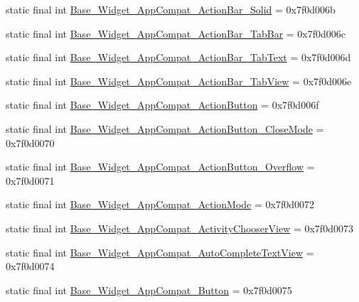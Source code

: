 \begin{DoxyCompactItemize}
\item 
static final int \mbox{\hyperlink{classandroid_1_1support_1_1design_1_1_r_1_1style_a1f9e47e1c00a31c23b8ac75d6b4adb6b}{Base\+\_\+\+Widget\+\_\+\+App\+Compat\+\_\+\+Action\+Bar\+\_\+\+Solid}} = 0x7f0d006b
\item 
static final int \mbox{\hyperlink{classandroid_1_1support_1_1design_1_1_r_1_1style_aa4eca4c56c553fe2c7950b72fefae483}{Base\+\_\+\+Widget\+\_\+\+App\+Compat\+\_\+\+Action\+Bar\+\_\+\+Tab\+Bar}} = 0x7f0d006c
\item 
static final int \mbox{\hyperlink{classandroid_1_1support_1_1design_1_1_r_1_1style_aa8ddc5fdad0f299e2b52eddda088ebe8}{Base\+\_\+\+Widget\+\_\+\+App\+Compat\+\_\+\+Action\+Bar\+\_\+\+Tab\+Text}} = 0x7f0d006d
\item 
static final int \mbox{\hyperlink{classandroid_1_1support_1_1design_1_1_r_1_1style_a2dad992aa3516234c551f7f759ff3b28}{Base\+\_\+\+Widget\+\_\+\+App\+Compat\+\_\+\+Action\+Bar\+\_\+\+Tab\+View}} = 0x7f0d006e
\item 
static final int \mbox{\hyperlink{classandroid_1_1support_1_1design_1_1_r_1_1style_a4c4022741dec751bc0474b30cc3f7ac7}{Base\+\_\+\+Widget\+\_\+\+App\+Compat\+\_\+\+Action\+Button}} = 0x7f0d006f
\item 
static final int \mbox{\hyperlink{classandroid_1_1support_1_1design_1_1_r_1_1style_a0b796011a9c0f9cf164281e2217c9300}{Base\+\_\+\+Widget\+\_\+\+App\+Compat\+\_\+\+Action\+Button\+\_\+\+Close\+Mode}} = 0x7f0d0070
\item 
static final int \mbox{\hyperlink{classandroid_1_1support_1_1design_1_1_r_1_1style_ac6620c5c97b037d4dd21cca350cea322}{Base\+\_\+\+Widget\+\_\+\+App\+Compat\+\_\+\+Action\+Button\+\_\+\+Overflow}} = 0x7f0d0071
\item 
static final int \mbox{\hyperlink{classandroid_1_1support_1_1design_1_1_r_1_1style_afadec33a3b80d10805dd65b0600a194b}{Base\+\_\+\+Widget\+\_\+\+App\+Compat\+\_\+\+Action\+Mode}} = 0x7f0d0072
\item 
static final int \mbox{\hyperlink{classandroid_1_1support_1_1design_1_1_r_1_1style_a1453879def50220f41b8becea7ed382b}{Base\+\_\+\+Widget\+\_\+\+App\+Compat\+\_\+\+Activity\+Chooser\+View}} = 0x7f0d0073
\item 
static final int \mbox{\hyperlink{classandroid_1_1support_1_1design_1_1_r_1_1style_a9858e7079d9ba63620d2767358539c57}{Base\+\_\+\+Widget\+\_\+\+App\+Compat\+\_\+\+Auto\+Complete\+Text\+View}} = 0x7f0d0074
\item 
static final int \mbox{\hyperlink{classandroid_1_1support_1_1design_1_1_r_1_1style_aed1321016b20d3d28dcc091269449221}{Base\+\_\+\+Widget\+\_\+\+App\+Compat\+\_\+\+Button}} = 0x7f0d0075

\end{DoxyCompactItemize}
